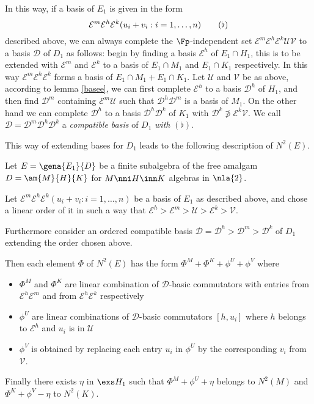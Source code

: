 In this way, if a basis of $E_{1}$ is given in the form
$$\mathcal{E}^{m}\mathcal{E}^{h}\mathcal{E}^{k}(u_{i}+v_{i}:i=1,\dots,n) \quad\quad{\bf(\flat)}$$
described above, we can always complete the $\Fp$-independent set $\mathcal{E}^{m}\mathcal{E}^{h}\mathcal{E}^{k}
\mathcal{U}\mathcal{V}$ to a basis $\mathcal{D}$ of $D_{1}$ as follows: begin by finding a basis $\mathcal{E}^{h}$ of $E_{1}\cap H_{1}$, this is to be extended with $\mathcal{E}^{m}$ and $\mathcal{E}^{k}$ to a basis of $E_{1}\cap M_{1}$ and $E_{1}\cap K_{1}$ respectively. In this way $\mathcal{E}^{m}\mathcal{E}^{h}\mathcal{E}^{k}$ forms a basis of
$E_{1}\cap M_{1}+E_{1}\cap K_{1}$.
Let $\mathcal{U}$ and $\mathcal{V}$ be as above, according to lemma \ref{basee}, we can first complete $\mathcal{E}^{h}$ to a basis $\mathcal{D}^{h}$ of $H_{1}$, and then 
find  $\mathcal{D}^{m}$ containing $\mathcal{E}^{m}\mathcal{U}$ such that $\mathcal{D}^{h}\mathcal{D}^{m}$ is a basis of $M_{1}$.
On the other hand we can complete  $\mathcal{D}^{h}$ to a basis $\mathcal{D}^{h}\mathcal{D}^{k}$ of $K_{1}$ with $\mathcal{D}^{k}\nni
\mathcal{E}^{k}\mathcal{V}$.
We call $\mathcal{D}=\mathcal{D}^{m}\mathcal{D}^{h}\mathcal{D}^{k}$
a {\em compatible basis} of $D_{1}$ \emph{with} {\bf $(\flat)$}. %

This way of extending bases for $D_{1}$ leads to the following description of $N^{2}(E)$.
\begin{lem}\label{reldue}
Let $E=\gena{E_{1}}{D}$ be a finite subalgebra of the free amalgam $D=\am{M}{H}{K}$ for $M\nni H\inn K$ algebras
in $\nla{2}$.

Let  $\mathcal{E}^{m}\mathcal{E}^{h}\mathcal{E}^{k}(u_{i}+v_{i}:i=1,\dots,n)$ be a basis of $E_{1}$ as described above, and chose a linear order of it in such a way that
$\mathcal{E}^{h}>\mathcal{E}^{m}>\mathcal{U}>\mathcal{E}^{k}>\mathcal{V}$.

Furthermore consider an ordered compatible basis $\mathcal{D}=\mathcal{D}^{h}>\mathcal{D}^{m}>\mathcal{D}^{k}$ of $D_{1}$ extending the order chosen above.

Then each element $\Phi$ of $N^{2}(E)$ has the form $\Phi^{M}+\Phi^{K}+\phi^{U}+\phi^{V}$ where
\begin{itemize}
\item[]$\Phi^{M}$ and $\Phi^{K}$ are linear combination of $\mathcal{D}$-basic commutators with entries from $\mathcal{E}^{h}\mathcal{E}^{m}$ and
from $\mathcal{E}^{h}\mathcal{E}^{k}$ respectively
\item[]$\phi^{U}$ are linear combinations of $\mathcal{D}$-basic commutators $[h,u_{i}]$ where $h$ belongs to $\mathcal{E}^{h}$ and
$u_{i}$ is in $\mathcal{U}$
\item[]$\phi^{V}$ is obtained by replacing each entry $u_{i}$ in $\phi^{U}$ by the corresponding $v_{i}$ from $\mathcal{V}$.
\end{itemize}
Finally there exists $\eta$ in $\exs H_{1}$ such that $\Phi^{M}+\phi^{U}+\eta$ belongs to $N^{2}(M)$ and $\Phi^{K}+\phi^{V}-\eta$ to $N^{2}(K)$.
\end{lem}

